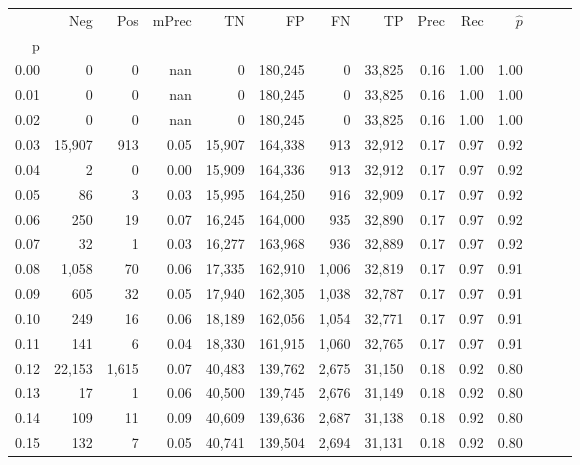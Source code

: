 \begin{tabular}{rrrrrrrrrrrrrr}
\toprule
{} &     Neg &    Pos & mPrec &       TN &       FP &      FN &      TP &  Prec &   Rec & $\hat{p}$ \\
p    &         &        &       &          &          &         &         &       &       &           \\
\midrule
0.00 &       0 &      0 &   nan &        0 &  180,245 &       0 &  33,825 &  0.16 &  1.00 &      1.00 \\
0.01 &       0 &      0 &   nan &        0 &  180,245 &       0 &  33,825 &  0.16 &  1.00 &      1.00 \\
0.02 &       0 &      0 &   nan &        0 &  180,245 &       0 &  33,825 &  0.16 &  1.00 &      1.00 \\
0.03 &  15,907 &    913 &  0.05 &   15,907 &  164,338 &     913 &  32,912 &  0.17 &  0.97 &      0.92 \\
0.04 &       2 &      0 &  0.00 &   15,909 &  164,336 &     913 &  32,912 &  0.17 &  0.97 &      0.92 \\
0.05 &      86 &      3 &  0.03 &   15,995 &  164,250 &     916 &  32,909 &  0.17 &  0.97 &      0.92 \\
0.06 &     250 &     19 &  0.07 &   16,245 &  164,000 &     935 &  32,890 &  0.17 &  0.97 &      0.92 \\
0.07 &      32 &      1 &  0.03 &   16,277 &  163,968 &     936 &  32,889 &  0.17 &  0.97 &      0.92 \\
0.08 &   1,058 &     70 &  0.06 &   17,335 &  162,910 &   1,006 &  32,819 &  0.17 &  0.97 &      0.91 \\
0.09 &     605 &     32 &  0.05 &   17,940 &  162,305 &   1,038 &  32,787 &  0.17 &  0.97 &      0.91 \\
0.10 &     249 &     16 &  0.06 &   18,189 &  162,056 &   1,054 &  32,771 &  0.17 &  0.97 &      0.91 \\
0.11 &     141 &      6 &  0.04 &   18,330 &  161,915 &   1,060 &  32,765 &  0.17 &  0.97 &      0.91 \\
0.12 &  22,153 &  1,615 &  0.07 &   40,483 &  139,762 &   2,675 &  31,150 &  0.18 &  0.92 &      0.80 \\
0.13 &      17 &      1 &  0.06 &   40,500 &  139,745 &   2,676 &  31,149 &  0.18 &  0.92 &      0.80 \\
0.14 &     109 &     11 &  0.09 &   40,609 &  139,636 &   2,687 &  31,138 &  0.18 &  0.92 &      0.80 \\
0.15 &     132 &      7 &  0.05 &   40,741 &  139,504 &   2,694 &  31,131 &  0.18 &  0.92 &      0.80 \\

\end{tabular}
